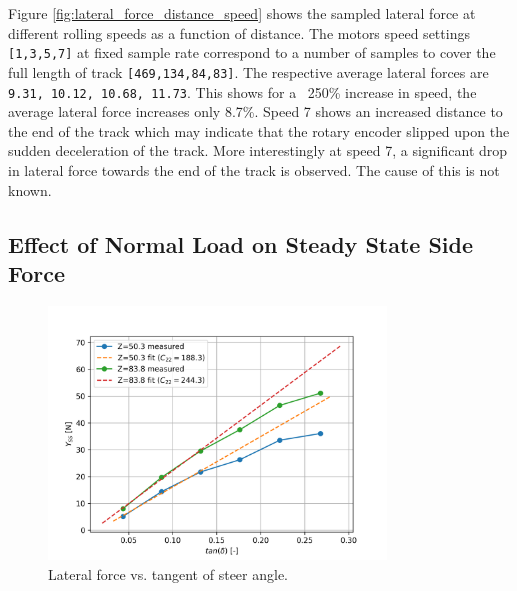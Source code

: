 \documentclass{article}
\begin{document}
Figure \ref{fig:lateral_force_distance_speed} shows the sampled lateral force at different rolling speeds as a function of distance.
The motors speed settings \texttt{[1,3,5,7]} at fixed sample rate correspond to a number of samples to cover the full length of track \texttt{[469,134,84,83]}.
The respective average lateral forces are \texttt{9.31, 10.12, 10.68, 11.73}.
This shows for a ~250\% increase in speed, the average lateral force increases only 8.7\%.
Speed 7 shows an increased distance to the end of the track which may indicate that the rotary encoder slipped upon the sudden deceleration of the track.
More interestingly at speed 7, a significant drop in lateral force towards the end of the track is observed.
The cause of this is not known.

\subsection{\textbf{Effect of Normal Load on Steady State Side Force}}

\begin{figure}[H]
    \centering
    \includegraphics[width=0.8\textwidth]{4.3/Yss_vs_tandelta.png}
    \caption{Lateral force vs. tangent of steer angle.}
    \label{fig:Y_vs_alpha}
\end{figure}
\end{document}
